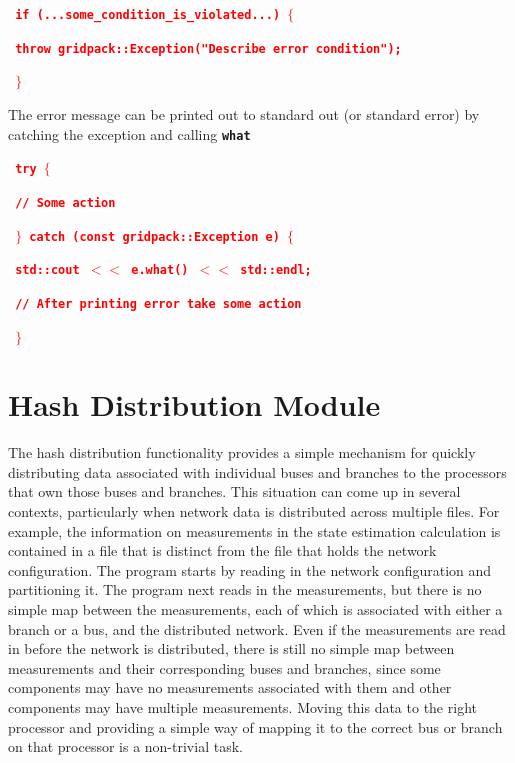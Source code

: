 \documentclass[12pt]{report} %
\begin{document}
\textcolor{red}{\texttt{\textbf{    if (...some\_condition\_is\_violated...) $\boldsymbol{\mathrm{\{}}$}}}

\textcolor{red}{\texttt{\textbf{      throw gridpack::Exception("Describe error condition");}}}

\textcolor{red}{\texttt{\textbf{    $\boldsymbol{\mathrm{\}}}$}}}

The error message can be printed out to standard out (or standard error) by catching the exception and calling \texttt{\textbf{what}}

\textcolor{red}{\texttt{\textbf{    try $\boldsymbol{\mathrm{\{}}$}}}

\textcolor{red}{\texttt{\textbf{       // Some action}}}

\textcolor{red}{\texttt{\textbf{    $\boldsymbol{\mathrm{\}}}$ catch (const gridpack::Exception e) $\boldsymbol{\mathrm{\{}}$}}}

\textcolor{red}{\texttt{\textbf{      std::cout $\boldsymbol{\mathrm{<}}$$\boldsymbol{\mathrm{<}}$ e.what() $\boldsymbol{\mathrm{<}}$$\boldsymbol{\mathrm{<}}$ std::endl;}}}

\textcolor{red}{\texttt{\textbf{      // After printing error take some action}}}

\textcolor{red}{\texttt{\textbf{    $\boldsymbol{\mathrm{\}}}$}}}

\section{Hash Distribution Module}

The hash distribution functionality provides a simple mechanism for quickly distributing data associated with individual buses and branches to the processors that own those buses and branches. This situation can come up in several contexts, particularly when network data is distributed across multiple files. For example, the information on measurements in the state estimation calculation is contained in a file that is distinct from the file that holds the network configuration. The program starts by reading in the network configuration and partitioning it. The program next reads in the measurements, but there is no simple map between the measurements, each of which is associated with either a branch or a bus, and the distributed network. Even if the measurements are read in before the network is distributed, there is still no simple map between measurements and their corresponding buses and branches, since some components may have no measurements associated with them and other components may have multiple measurements. Moving this data to the right processor and providing a simple way of mapping it to the correct bus or branch on that processor is a non-trivial task.
\end{document}
